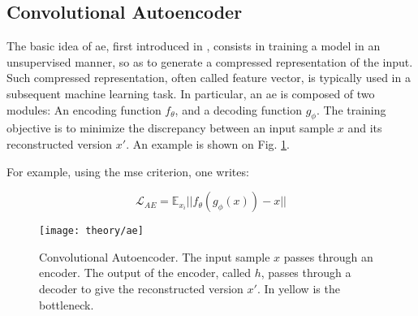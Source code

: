 \subsection{Convolutional Autoencoder}
The basic idea of \gls{ae}, first introduced in \cite{vincent10}, consists in training a model in an unsupervised manner, so as to generate a compressed representation of the input.
Such compressed representation, often called feature vector, is typically used in a subsequent machine learning task.
In particular, an \gls{ae} is composed of two modules: An encoding function $f_{\theta}$, and a decoding function $g_{\phi}$.
The training objective is to minimize the discrepancy between an input sample $x$ and its reconstructed version $x'$.
An example is shown on Fig. \ref{fig:ae}.

For example, using the \gls{mse} criterion, one writes:

\begin{equation}
\mathcal{L}_{AE} = \mathbb{E}_{x_{i}}||f_{\theta}(g_{\phi}(x)) - x ||
\end{equation}


\begin{figure}[!htpb]
  \centering
  \texttt{[image: theory/ae]}
  \caption{Convolutional Autoencoder.
    The input sample $x$ passes through an encoder.
    The output of the encoder, called $h$, passes through a decoder to give the reconstructed version $x'$.
    In yellow is the bottleneck.}
  \label{fig:ae}
\end{figure}



